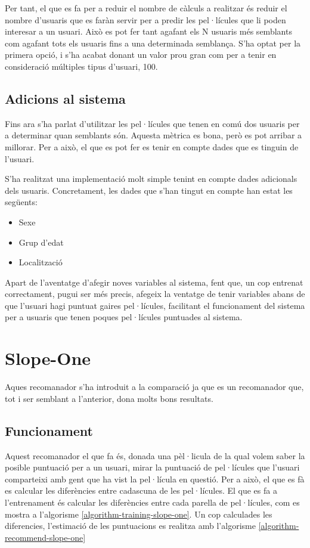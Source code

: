 Per tant, el que es fa per a reduir el nombre de càlculs a realitzar és reduir el nombre d'usuaris que es faràn servir per a predir les pel·lícules que li poden interesar a un usuari. Això es pot fer tant agafant els N usuaris més semblants com agafant tots els usuaris fins a una determinada semblança. S'ha optat per la primera opció, i s'ha acabat donant un valor prou gran com per a tenir en consideració múltiples tipus d'usuari, 100.

\subsection{Adicions al sistema}

Fins ara s'ha parlat d'utilitzar les pel·lícules que tenen en comú dos usuaris per a determinar quan semblants són. Aquesta mètrica es bona, però es pot arribar a millorar. Per a això, el que es pot fer es tenir en compte dades que es tinguin de l'usuari.

S'ha realitzat una implementació molt simple tenint en compte dades adicionals dels usuaris. Concretament, les dades que s'han tingut en compte han estat les següents:

\begin{itemize}
	\item Sexe
	\item Grup d'edat
	\item Localització
\end{itemize}

Apart de l'aventatge d'afegir noves variables al sistema, fent que, un cop entrenat correctament, pugui ser més precis, afegeix la ventatge de tenir variables abans de que l'usuari hagi puntuat gaires pel·lícules, facilitant el funcionament del sistema per a usuaris que tenen poques pel·lícules puntuades al sistema.

\section{Slope-One}

Aques recomanador s'ha introduit a la comparació ja que es un recomanador que, tot i ser semblant a l'anterior, dona molts bons resultats.

\subsection{Funcionament}

Aquest recomanador el que fa és, donada una pèl·licula de la qual volem saber la posible puntuació per a un usuari, mirar la puntuació de pel·lícules que l'usuari comparteixi amb gent que ha vist la pel·lícula en questió. Per a això, el que es fà es calcular les diferències entre cadascuna de les pel·lícules. El que es fa a l'entrenament és calcular les diferències entre cada parella de pel·lícules, com es mostra a l'algorisme \ref{algorithm-training-slope-one}. Un cop calculades les diferencies, l'estimació de les puntuacions es realitza amb l'algorisme \ref{algorithm-recommend-slope-one}


